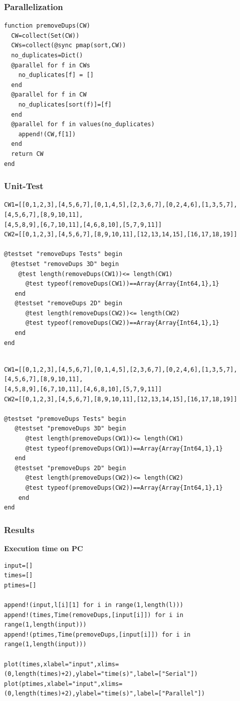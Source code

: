 \documentclass[a4paper,12pt]{article}
\begin{document}
\subsubsection{Parallelization}
\begin{Verbatim}[fontsize=\footnotesize]
function premoveDups(CW)
  CW=collect(Set(CW))
  CWs=collect(@sync pmap(sort,CW))
  no_duplicates=Dict()
  @parallel for f in CWs
    no_duplicates[f] = []
  end
  @parallel for f in CW
    no_duplicates[sort(f)]=[f]
  end
  @parallel for f in values(no_duplicates)
    append!(CW,f[1])
  end
  return CW
end
\end{Verbatim}
\subsubsection{Unit-Test}
\begin{Verbatim}[fontsize=\footnotesize]
CW1=[[0,1,2,3],[4,5,6,7],[0,1,4,5],[2,3,6,7],[0,2,4,6],[1,3,5,7],[4,5,6,7],[8,9,10,11],
[4,5,8,9],[6,7,10,11],[4,6,8,10],[5,7,9,11]]
CW2=[[0,1,2,3],[4,5,6,7],[8,9,10,11],[12,13,14,15],[16,17,18,19]]

@testset "removeDups Tests" begin
  @testset "removeDups 3D" begin
    @test length(removeDups(CW1))<= length(CW1)
      @test typeof(removeDups(CW1))==Array{Array{Int64,1},1}
   end
   @testset "removeDups 2D" begin
      @test length(removeDups(CW2))<= length(CW2)
      @test typeof(removeDups(CW2))==Array{Array{Int64,1},1}
   end
end

\end{Verbatim}
\begin{Verbatim}[fontsize=\footnotesize]

CW1=[[0,1,2,3],[4,5,6,7],[0,1,4,5],[2,3,6,7],[0,2,4,6],[1,3,5,7],[4,5,6,7],[8,9,10,11],
[4,5,8,9],[6,7,10,11],[4,6,8,10],[5,7,9,11]]
CW2=[[0,1,2,3],[4,5,6,7],[8,9,10,11],[12,13,14,15],[16,17,18,19]]

@testset "premoveDups Tests" begin
   @testset "premoveDups 3D" begin
      @test length(premoveDups(CW1))<= length(CW1)
      @test typeof(premoveDups(CW1))==Array{Array{Int64,1},1}
   end
   @testset "premoveDups 2D" begin
      @test length(premoveDups(CW2))<= length(CW2)
      @test typeof(premoveDups(CW2))==Array{Array{Int64,1},1}
    end
end
\end{Verbatim}

\subsubsection{Results}
\textbf{Execution time on PC}
\begin{Verbatim}[fontsize=\footnotesize]
input=[]
times=[]
ptimes=[]

append!(input,l[i][1] for i in range(1,length(l)))
append!(times,Time(removeDups,[input[i]]) for i in range(1,length(input)))
append!(ptimes,Time(premoveDups,[input[i]]) for i in range(1,length(input)))

plot(times,xlabel="input",xlims=(0,length(times)+2),ylabel="time(s)",label=["Serial"])
plot(ptimes,xlabel="input",xlims=(0,length(times)+2),ylabel="time(s)",label=["Parallel"])

\end{Verbatim}
\end{document}
